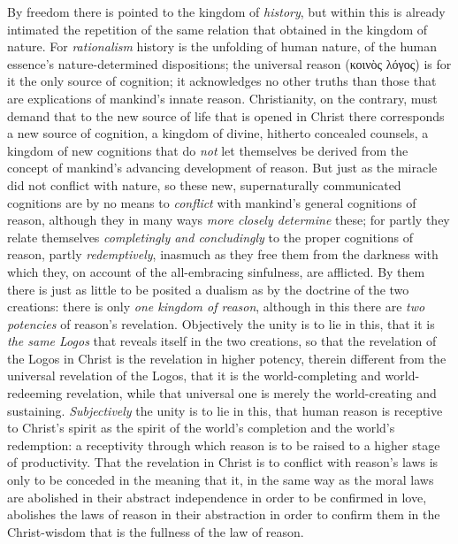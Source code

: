 \documentclass[12pt,a4paper]{book}
\begin{document}
By freedom there is pointed to the kingdom of \emph{history}, but within this is already
intimated the repetition of the same relation that obtained in the kingdom of nature. For
\emph{rationalism} history is the unfolding of human nature, of the human essence's
nature-determined dispositions; the universal reason (κοινὸς λόγος) is for it the only
source of cognition; it acknowledges no other truths than those that are explications of
mankind's innate reason. Christianity, on the contrary, must demand that to the new source
of life that is opened in Christ there corresponds a new source of cognition, a kingdom of
divine, hitherto concealed counsels, a kingdom of new cognitions that do \emph{not} let
themselves be derived from the concept of mankind's advancing development of reason. But
just as the miracle did not conflict with nature, so these new, supernaturally
communicated cognitions are by no means to \emph{conflict} with mankind's general cognitions of
reason, although they in many ways \emph{more closely determine} these; for partly they
relate themselves \emph{completingly and concludingly} to the proper cognitions of reason,
partly \emph{redemptively}, inasmuch as they free them from the darkness with which they,
on account of the all-embracing sinfulness, are afflicted. By them there is just as little
to be posited a dualism as by the doctrine of the two creations: there is only \emph{one
kingdom of reason}, although in this there are \emph{two potencies} of reason's revelation.
Objectively the unity is to lie in this, that it is \emph{the same Logos} that reveals
itself in the two creations, so that the revelation of the Logos in Christ is the
revelation in higher potency, therein different from the universal revelation of the Logos,
that it is the world-completing and world-redeeming revelation, while that universal one is
merely the world-creating and sustaining. \emph{Subjectively} the unity is to lie in this, that
human reason is receptive to Christ's spirit as the spirit of the world's completion and
the world's redemption: a receptivity through which reason is to be raised to a higher
stage of productivity. That the revelation in Christ is to conflict with reason's laws is
only to be conceded in the meaning that it, in the same way as the moral laws are abolished
in their abstract independence in order to be confirmed in love, abolishes the laws of
reason in their abstraction in order to confirm them in the Christ-wisdom that is the
fullness of the law of reason.
\end{document}
